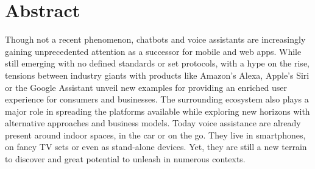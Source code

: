 %
%
%


\newpage
\chapter*{Abstract}

Though not a recent phenomenon, chatbots and voice assistants are increasingly gaining unprecedented attention as a successor for mobile and web apps. While still emerging with no defined standards or set protocols, with a hype on the rise, tensions between industry giants with products like Amazon's Alexa, Apple's Siri or the Google Assistant %
unveil new examples for providing an enriched user experience for consumers and businesses. The surrounding ecosystem also plays a major role in spreading the platforms available while exploring new horizons with alternative approaches and business models. Today voice assistance are already present around indoor spaces, in the car or on the go. They live in smartphones, on fancy TV sets or even as stand-alone devices. Yet, they are still a new terrain to discover and great potential to unleash in numerous contexts.\\ 

